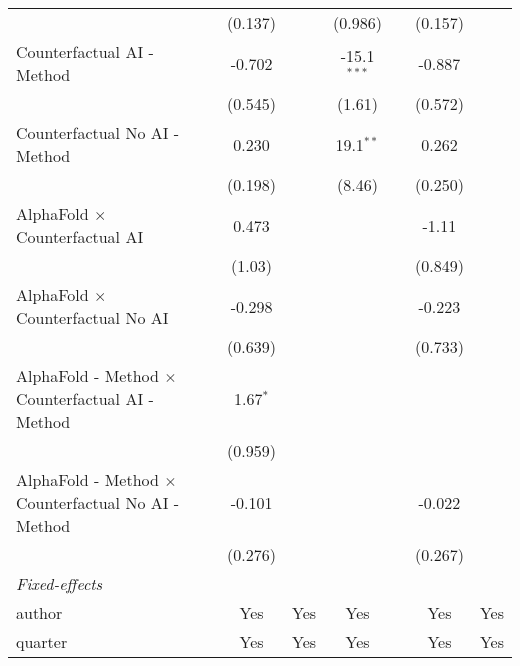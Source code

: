 \begin{tabular}{lcccccc}
                                                              & (0.137)    &               & (0.986)       &      & (0.157) &   \\   
   Counterfactual AI - Method                                 & -0.702     &               & -15.1$^{***}$ &      & -0.887  &   \\   
                                                              & (0.545)    &               & (1.61)        &      & (0.572) &   \\   
   Counterfactual No AI - Method                              & 0.230      &               & 19.1$^{**}$   &      & 0.262   &   \\   
                                                              & (0.198)    &               & (8.46)        &      & (0.250) &   \\   
   AlphaFold $\times$ Counterfactual AI                       & 0.473      &               &               &      & -1.11   &   \\   
                                                              & (1.03)     &               &               &      & (0.849) &   \\   
   AlphaFold $\times$ Counterfactual No AI                    & -0.298     &               &               &      & -0.223  &   \\   
                                                              & (0.639)    &               &               &      & (0.733) &   \\   
   AlphaFold - Method $\times$ Counterfactual AI - Method     & 1.67$^{*}$ &               &               &      &         &   \\   
                                                              & (0.959)    &               &               &      &         &   \\   
   AlphaFold - Method $\times$ Counterfactual No AI - Method  & -0.101     &               &               &      & -0.022  &   \\   
                                                              & (0.276)    &               &               &      & (0.267) &   \\   
   \midrule
   \emph{Fixed-effects}\\
   author                                                     & Yes        & Yes           & Yes           &      & Yes     & Yes\\  
   quarter                                                    & Yes        & Yes           & Yes           &      & Yes     & Yes\\  

\end{tabular}
